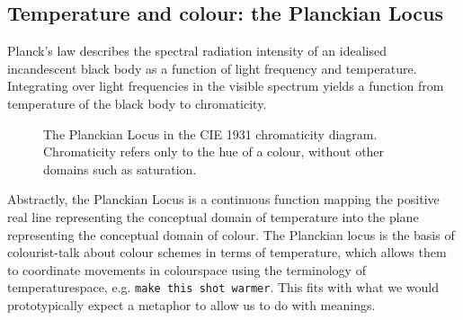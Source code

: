 \subsection{Temperature and colour: the Planckian Locus}

\begin{example}\label{ex:planck1}
Planck's law describes the spectral radiation intensity of an idealised incandescent black body as a function of light frequency and temperature. Integrating over light frequencies in the visible spectrum yields a function from temperature of the black body to chromaticity.
\begin{figure}[h]
\centering
{}
\caption{The Planckian Locus in the CIE 1931 chromaticity diagram. Chromaticity refers only to the hue of a colour, without other domains such as saturation.}
\end{figure}
\end{example}

Abstractly, the Planckian Locus is a continuous function mapping the positive real line representing the conceptual domain of temperature into the plane representing the conceptual domain of colour. The Planckian locus is the basis of colourist-talk about colour schemes in terms of temperature, which allows them to coordinate movements in colourspace using the terminology of temperaturespace, e.g. \texttt{make this shot warmer}. This fits with what we would prototypically expect a metaphor to allow us to do with meanings.

